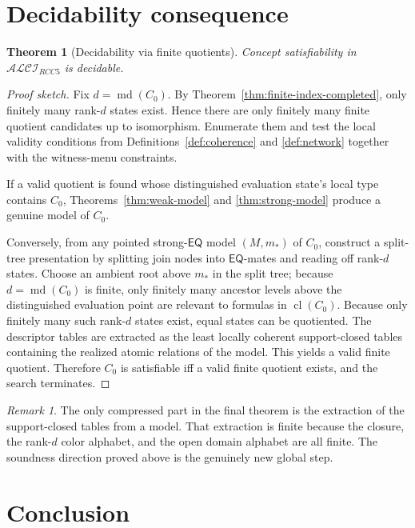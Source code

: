 \documentclass[11pt]{article}
\newtheorem{theorem}[definition]{Theorem}
\theoremstyle{remark}
\newtheorem{remark}[definition]{Remark}
\newcommand{\EQ}{\mathsf{EQ}}
\newcommand{\cl}{\operatorname{cl}}
\newcommand{\md}{\operatorname{md}}
\begin{document}
\section{Decidability consequence}

\begin{theorem}[Decidability via finite quotients]\label{thm:decidability}
Concept satisfiability in $\mathcal{ALCI}_{RCC5}$ is decidable.
\end{theorem}

\begin{proof}[Proof sketch]
Fix $d=\md(C_0)$. By Theorem~\ref{thm:finite-index-completed}, only finitely many rank-$d$ states exist. Hence there are only finitely many finite quotient candidates up to isomorphism. Enumerate them and test the local validity conditions from Definitions~\ref{def:coherence} and \ref{def:network} together with the witness-menu constraints.

If a valid quotient is found whose distinguished evaluation state's local type contains $C_0$, Theorems~\ref{thm:weak-model} and \ref{thm:strong-model} produce a genuine model of $C_0$.

Conversely, from any pointed strong-$\EQ$ model $(M,m_{\ast})$ of $C_0$, construct a split-tree presentation by splitting join nodes into $\EQ$-mates and reading off rank-$d$ states. Choose an ambient root above $m_{\ast}$ in the split tree; because $d=\md(C_0)$ is finite, only finitely many ancestor levels above the distinguished evaluation point are relevant to formulas in $\cl(C_0)$. Because only finitely many such rank-$d$ states exist, equal states can be quotiented. The descriptor tables are extracted as the least locally coherent support-closed tables containing the realized atomic relations of the model. This yields a valid finite quotient. Therefore $C_0$ is satisfiable iff a valid finite quotient exists, and the search terminates.
\end{proof}

\begin{remark}
The only compressed part in the final theorem is the extraction of the support-closed tables from a model. That extraction is finite because the closure, the rank-$d$ color alphabet, and the open domain alphabet are all finite. The soundness direction proved above is the genuinely new global step.
\end{remark}

\section{Conclusion}
\end{document}
